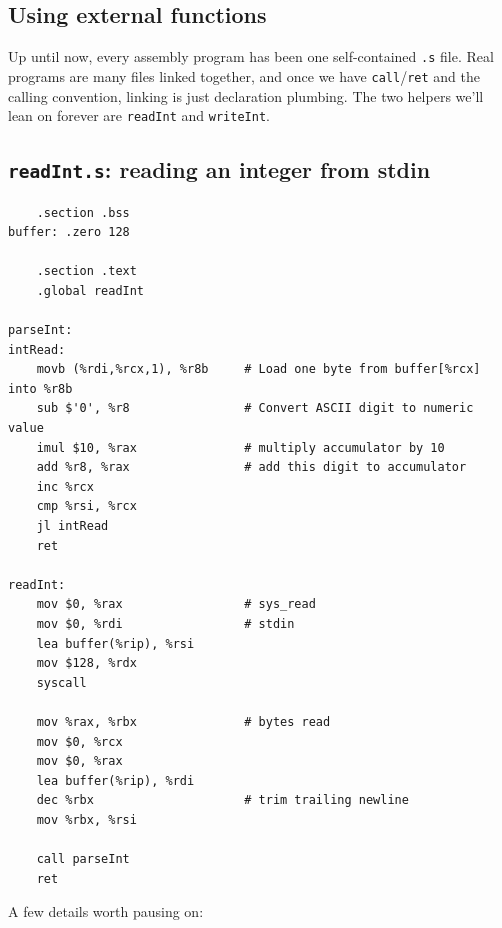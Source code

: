 \documentclass[11pt]{article}
\begin{document}
\subsection*{Using external functions}

Up until now, every assembly program has been one self-contained
\texttt{.s} file. Real programs are many files linked together, and
once we have \texttt{call}/\texttt{ret} and the calling convention,
linking is just declaration plumbing. The two helpers we'll lean on
forever are \texttt{readInt} and \texttt{writeInt}.

\subsection*{\texttt{readInt.s}: reading an integer from stdin}

\begin{lstlisting}
    .section .bss
buffer: .zero 128

    .section .text
    .global readInt

parseInt:
intRead:
    movb (%rdi,%rcx,1), %r8b     # Load one byte from buffer[%rcx] into %r8b
    sub $'0', %r8                # Convert ASCII digit to numeric value
    imul $10, %rax               # multiply accumulator by 10
    add %r8, %rax                # add this digit to accumulator
    inc %rcx
    cmp %rsi, %rcx
    jl intRead
    ret

readInt:
    mov $0, %rax                 # sys_read
    mov $0, %rdi                 # stdin
    lea buffer(%rip), %rsi
    mov $128, %rdx
    syscall

    mov %rax, %rbx               # bytes read
    mov $0, %rcx
    mov $0, %rax
    lea buffer(%rip), %rdi
    dec %rbx                     # trim trailing newline
    mov %rbx, %rsi

    call parseInt
    ret
\end{lstlisting}

A few details worth pausing on:
\end{document}
